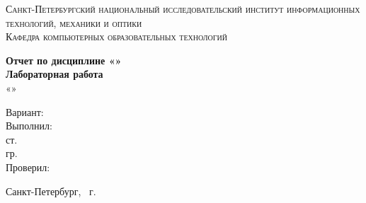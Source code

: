 \begin{titlepage}
    \begin{center}
        \textsc{Санкт-Петербургский национальный исследовательский институт информационных технологий, механики и оптики\\[5mm]
        Кафедра компьютерных образовательных технологий}

        \vfill

        \textbf{Отчет по дисциплине «\discipline»\\[3mm]
        Лабораторная работа \labNumber\\[3mm]
        }
        «\labName»\\[20mm]
    \end{center}

    \hfill
    \begin{minipage}{.5\textwidth}
        Вариант: \labVariant\\[2mm]
        Выполнил:\\[2mm]
        ст. \student\\
        гр. \studentGroup\\[5mm]

        Проверил:\\[2mm]
        \tutor
    \end{minipage}%
    \vfill
    \begin{center}
        Санкт-Петербург, \theyear\ г.
    \end{center}
\end{titlepage}
